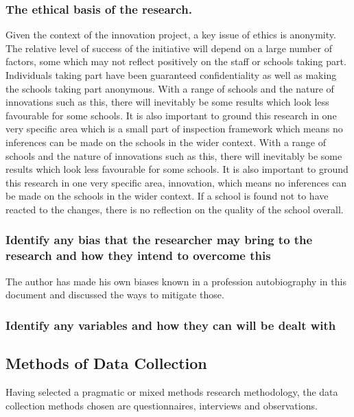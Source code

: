\subsubsection{The ethical basis of the research.}
Given the context of the innovation project, a key issue of ethics is anonymity. The relative level of success of the initiative will depend on a large number of factors, some which may not reflect positively on the staff or schools taking part. Individuals taking part have been guaranteed confidentiality as well as making the schools taking part anonymous. With a range of schools and the nature of innovations such as this, there will inevitably be some results which look less favourable for some schools. It is also important to ground this research in one very specific area which is a small part of inspection framework which means no inferences can be made on the schools in the wider context.
With a range of schools and the nature of innovations such as this, there will inevitably be some results which look less favourable for some schools. It is also important to ground this research in one very specific area, innovation, which means no inferences can be made on the schools in the wider context. If a school is found not to have reacted to the changes, there is no reflection on the quality of the school overall.

\subsubsection{Identify any bias that the researcher may bring to the research and how they intend to overcome this}

The author has made his own biases known in a profession autobiography in this document and discussed the ways to mitigate those.

\subsubsection{Identify any variables and how they can will be dealt with}

\subsection{Methods of Data Collection}
Having selected a pragmatic or mixed methods research methodology, the data collection methods chosen are questionnaires, interviews and observations.

